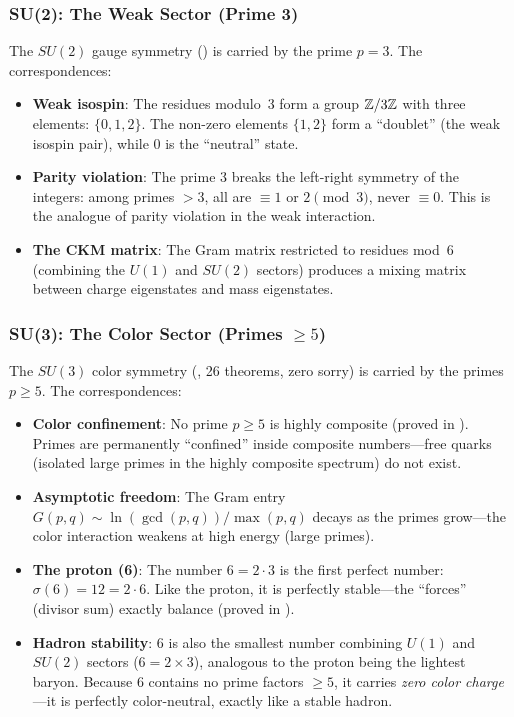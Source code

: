\subsubsection{SU(2): The Weak Sector (Prime 3)}

The $SU(2)$ gauge symmetry () is carried by
the prime $p = 3$. The correspondences:
\begin{itemize}
  \item \textbf{Weak isospin}: The residues modulo~3 form a group
    $\mathbb{Z}/3\mathbb{Z}$ with three elements: $\{0, 1, 2\}$. The non-zero elements
    $\{1, 2\}$ form a ``doublet'' (the weak isospin pair), while $0$
    is the ``neutral'' state.
  \item \textbf{Parity violation}: The prime 3 breaks the
    left-right symmetry of the integers: among primes $> 3$,
    all are $\equiv 1$ or $2 \pmod{3}$, never $\equiv 0$.
    This is the analogue of parity violation in the weak
    interaction.
  \item \textbf{The CKM matrix}: The Gram matrix restricted to
    residues mod~6 (combining the $U(1)$ and $SU(2)$ sectors)
    produces a mixing matrix between charge eigenstates
    and mass eigenstates.
\end{itemize}

\subsubsection{SU(3): The Color Sector (Primes $\geq 5$)}

The $SU(3)$ color symmetry (,
26 theorems, zero sorry) is carried by the primes $p \geq 5$.
The correspondences:
\begin{itemize}
  \item \textbf{Color confinement}: No prime $p \geq 5$ is
    highly composite (proved in ).
    Primes are permanently ``confined'' inside composite
    numbers---free quarks (isolated large primes in the highly
    composite spectrum) do not exist.
  \item \textbf{Asymptotic freedom}: The Gram entry
    $G(p,q) \sim \ln(\gcd(p,q))/\max(p,q)$ decays as the
    primes grow---the color interaction weakens at high energy
    (large primes).
  \item \textbf{The proton (6)}: The number $6 = 2 \cdot 3$ is the
    first perfect number: $\sigma(6) = 12 = 2 \cdot 6$.
    Like the proton, it is perfectly stable---the ``forces''
    (divisor sum) exactly balance (proved in ).
  \item \textbf{Hadron stability}: $6$ is also the smallest
    number combining $U(1)$ and $SU(2)$ sectors ($6 = 2 \times 3$),
    analogous to the proton being the lightest baryon.
    Because $6$ contains no prime factors $\geq 5$, it carries
    \emph{zero color charge}---it is perfectly color-neutral,
    exactly like a stable hadron.
\end{itemize}

